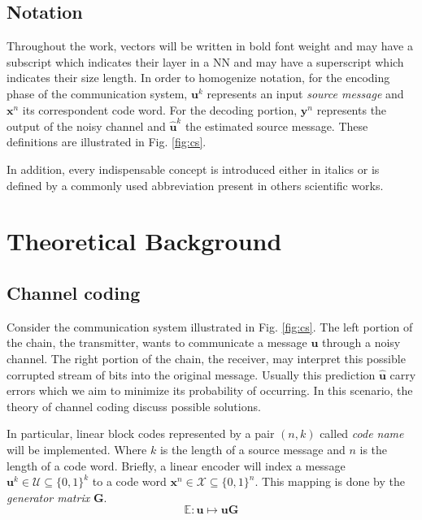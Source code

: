\documentclass[conference]{IEEEtran}
\begin{document}
\subsection{Notation}
Throughout the work, vectors will be written in bold font weight and may  have a subscript which indicates their layer in a NN and may have a superscript which indicates their size length. In order to homogenize notation, for the encoding phase of the communication system, $\textbf{u}^k$ represents an input \textit{source message} and $\textbf{x}^n$ its correspondent code word. For the decoding portion, $\textbf{y}^n$ represents the output of the noisy channel and $\hat{\textbf{u}}^k$ the estimated source message. These definitions are illustrated in Fig. \ref{fig:cs}.

In addition, every indispensable concept is introduced either in italics or is defined by a commonly used abbreviation present in others scientific works.


\section{Theoretical Background}

\subsection{Channel coding}
Consider the communication system illustrated in Fig. \ref{fig:cs}. The left portion of the chain, the transmitter, wants to communicate a message $\textbf{u}$ through a noisy channel. The right portion of the chain, the receiver, may interpret this possible corrupted stream of bits into the original message. Usually this prediction $\hat{\textbf{u}}$ carry errors which we aim to minimize its probability of occurring. In this scenario, the theory of channel coding discuss possible solutions. 

In particular, linear block codes represented by a pair $(n, k)$ called \textit{code name} will be implemented. Where $k$ is the length of a source message and $n$ is the length of a code word. Briefly, a linear encoder will index a message $\textbf{u}^k \in \mathcal{U} \subseteq \{0,1\}^k$ to a code word $\textbf{x}^n \in \mathcal{X} \subseteq \{0,1\}^n$. This mapping is done by the \textit{generator matrix} $ \textbf{G} $.
\begin{equation}\label{eq:encoding}
\mathbb{E}:\textbf{u} \mapsto \textbf{uG}
\end{equation}
\end{document}
